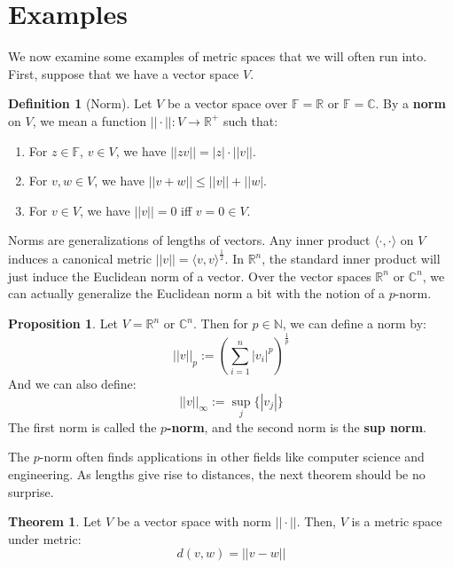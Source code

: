 \documentclass[11pt, oneside]{amsart}   	%
\theoremstyle{definition}
\newtheorem{definition}{Definition}[section]
\newtheorem{theorem}{Theorem}[section]
\newtheorem{prop}{Proposition}[section]
\begin{document}
\section{Examples}

	We now examine some examples of metric spaces that we will often run into. First, suppose that we have a vector space $V$.
	
	\begin{definition}[Norm]
		Let $V$ be a vector space over $\mathbb F = \mathbb R$ or $\mathbb F = \mathbb C$. By a \textbf{norm} on $V$, we mean a function $||\cdot|| : V
		\rightarrow\mathbb R^+$ such that:
		\begin{enumerate}
			\item For $z\in\mathbb F$, $v\in V$, we have $||zv|| = |z|\cdot||v||$.
			\item For $v, w\in V$, we have $||v + w||\leq ||v|| + ||w|$.
			\item For $v\in V$, we have $||v|| = 0$ iff $v = 0\in V$.
		\end{enumerate}
	\end{definition}
	
	Norms are generalizations of lengths of vectors. Any inner product $\langle\cdot, \cdot\rangle$ on $V$ induces a canonical metric $||v|| = \langle v, v
	\rangle^{\frac{1}{2}}$. In $\mathbb R^n$, the standard inner product will just induce the Euclidean norm of a vector. Over the vector spaces $\mathbb R^n$ or $
	\mathbb C^n$, we can actually generalize the Euclidean norm a bit with the notion of a $p$-norm.
	
	\begin{prop}
		Let $V = \mathbb R^n$ or $\mathbb C^n$. Then for $p\in\mathbb N$, we can define a norm by:
		$$
			||v||_p := (\sum_{i = 1}^n |v_i|^p)^{\frac{1}{p}}
		$$
		And we can also define:
		$$
			||v||_\infty := \sup_j\{|v_j|\}
		$$
		The first norm is called the \textbf{$p$-norm}, and the second norm is the \textbf{sup norm}.
	\end{prop}
	
	The $p$-norm often finds applications in other fields like computer science and engineering. As lengths give rise to distances, the next theorem should be no 
	surprise.
	
	\begin{theorem}
		Let $V$ be a vector space with norm $||\cdot||$. Then, $V$ is a metric space under metric:
		$$
			d(v, w) = ||v - w||
		$$
	\end{theorem}
	
\end{document}
